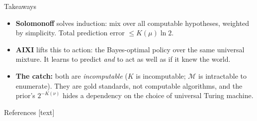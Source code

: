 \documentclass[10pt]{beamer}
\newcommand{\cM}{\mathcal{M}}
\begin{document}
\begin{frame}{Takeaways}
\begin{itemize}
    \item \textbf{Solomonoff} solves induction: mix over all computable hypotheses, weighted by simplicity.
    Total prediction error $\leq K(\mu)\ln 2$.
    \pause
    \item \textbf{AIXI} lifts this to action: the Bayes-optimal policy over the same universal mixture.
    It learns to predict \emph{and} to act as well as if it knew the world.
    \pause
    \item \textbf{The catch:} both are \emph{incomputable} ($K$ is incomputable; $\cM$ is intractable to enumerate).
    They are gold standards, not computable algorithms, and the prior's $2^{-K(\nu)}$ hides a dependency
    on the choice of universal Turing machine.
\end{itemize}
\end{frame}

\begin{frame}[allowframebreaks]{References}
\tiny
{}[text]


\end{frame}
\end{document}
